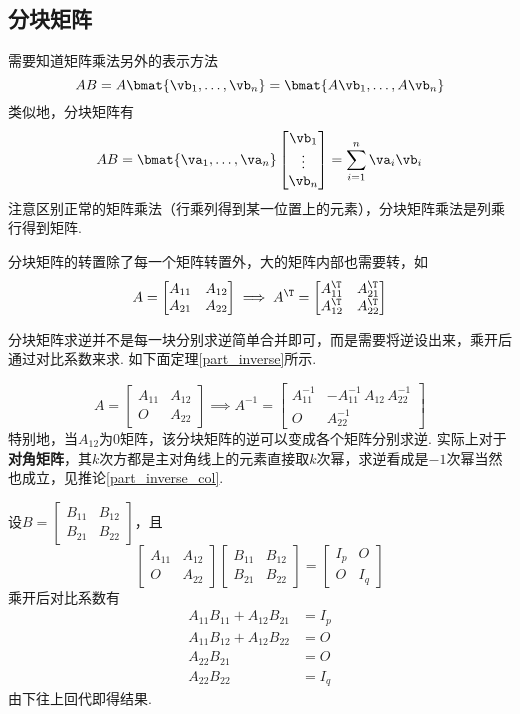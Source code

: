 \subsection{分块矩阵}
\par 需要知道矩阵乘法另外的表示方法
\[AB=A\bmat{\vb_1,\ldots,\vb_n}=\bmat{A\vb_1,\ldots,A\vb_n}\]
类似地，分块矩阵有
\[AB=\bmat{\va_1,\ldots,\va_n}\begin{bmatrix}\vb_1\\\vdots\\\vb_n\end{bmatrix}=\sum_{i=1}^n\va_i\vb_i\]
注意区别正常的矩阵乘法（行乘列得到某一位置上的元素），分块矩阵乘法是列乘行得到矩阵.
\par 分块矩阵的转置除了每一个矩阵转置外，大的矩阵内部也需要转，如
\[A=\begin{bmatrix}A_{11}&A_{12}\\A_{21}&A_{22}\end{bmatrix}\implies A^\T=\begin{bmatrix}A_{11}^\T&A_{21}^\T\\A_{12}^\T&A_{22}^\T\end{bmatrix}\]
\par 分块矩阵求逆并不是每一块分别求逆简单合并即可，而是需要将逆设出来，乘开后通过对比系数来求. 如下面定理\ref{part_inverse}所示.
\begin{theorem}
\label{part_inverse}
\[A=\begin{bmatrix}A_{11}&A_{12}\\O&A_{22}\end{bmatrix}\implies A^{-1}=\begin{bmatrix}A_{11}^{-1}&-A_{11}^{-1}\,A_{12}\,A_{22}^{-1}\\O&A_{22}^{-1}\end{bmatrix}\]
特别地，当$A_{12}$为$0$矩阵，该分块矩阵的逆可以变成各个矩阵分别求逆. 实际上对于\textbf{对角矩阵}，其$k$次方都是主对角线上的元素直接取$k$次幂，求逆看成是$-1$次幂当然也成立，见推论\ref{part_inverse_col}.
\end{theorem}
\begin{analysis}
设$B=\begin{bmatrix}B_{11}&B_{12}\\B_{21}&B_{22}\end{bmatrix}$，且
\[\begin{bmatrix}A_{11}&A_{12}\\O&A_{22}\end{bmatrix}\begin{bmatrix}B_{11}&B_{12}\\B_{21}&B_{22}\end{bmatrix}=\begin{bmatrix}I_p&O\\O&I_q\end{bmatrix}\]
乘开后对比系数有
\[\begin{aligned}
A_{11}B_{11}+A_{12}B_{21}&=I_p\\
A_{11}B_{12}+A_{12}B_{22}&=O\\
A_{22}B_{21}&=O\\
A_{22}B_{22}&=I_q\end{aligned}\]
由下往上回代即得结果.
\end{analysis}
